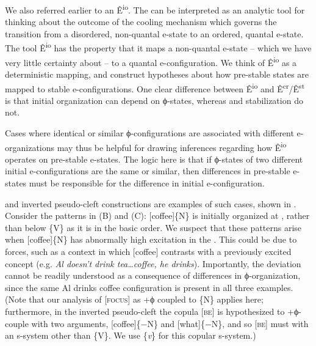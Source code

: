   We also referred earlier to an  Ê\textsuperscript{io}. The  can be interpreted as an analytic tool for thinking about the outcome of the cooling mechanism which governs the transition from a disordered, non-quantal e-state to an ordered, quantal e-state. The tool Ê\textsuperscript{io} has the property that it maps a non-quantal e-state -- which we have very little certainty about -- to a quantal e-con\-fig\-u\-ra\-tion. We think of Ê\textsuperscript{io} as a deterministic mapping, and construct hypotheses about how pre-stable states are mapped to stable e-con\-fig\-u\-ra\-tions. One clear difference between Ê\textsuperscript{io} and Ê\textsuperscript{cr}/Ê\textsuperscript{st} is that initial organization can depend on ϕ-states, whereas  and stabilization do not. 

  Cases where identical or similar ϕ-con\-fig\-u\-ra\-tions are associated with different e-organizations may thus be helpful for drawing inferences regarding how Ê\textsuperscript{io} operates on pre-stable e-states. The logic here is that if ϕ-states of two different initial e-con\-fig\-u\-ra\-tions are the same or similar, then differences in pre-stable e-states must be responsible for the difference in initial e-con\-fig\-u\-ra\-tion. 

   and inverted pseudo-cleft constructions are examples of such cases, shown in {}. Consider the patterns in (B) and (C): [coffee]\{N\} is initially organized at , rather than below \{V\} as it is in the basic order. We suspect that these patterns arise when [coffee]\{N\} has abnormally high excitation in the . This could be due to  forces, such as a context in which [coffee] contrasts with a previously excited concept (e.g. \textit{Al doesn't drink tea…coffee, he drinks}). Importantly, the deviation cannot be readily understood as a consequence of differences in ϕ-organization, since the same {\textbar}Al drinks coffee{\textbar} configuration is present in all three examples. (Note that our analysis of [\textsc{focus}] as +ϕ coupled to \{N\} applies here; furthermore, in the inverted pseudo-cleft the copula [\textsc{be}] is hypothesized to +ϕ-couple with two arguments, [coffee]\{−N\} and [what]\{−N\}, and so [\textsc{be}] must  with an s-system other than \{V\}. We use \{\textit{v}\} for this copular s-system.)

